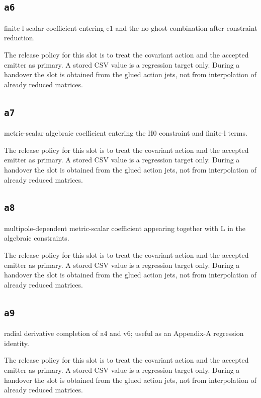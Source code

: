 \documentclass[11pt,a4paper,oneside]{book}
\begin{document}
\subsection{\texttt{a6}}
finite-l scalar coefficient entering e1 and the no-ghost combination after constraint reduction.

The release policy for this slot is to treat the covariant action and the accepted emitter as primary. A stored CSV value is a regression target only. During a handover the slot is obtained from the glued action jets, not from interpolation of already reduced matrices.\par

\subsection{\texttt{a7}}
metric-scalar algebraic coefficient entering the H0 constraint and finite-l terms.

The release policy for this slot is to treat the covariant action and the accepted emitter as primary. A stored CSV value is a regression target only. During a handover the slot is obtained from the glued action jets, not from interpolation of already reduced matrices.\par

\subsection{\texttt{a8}}
multipole-dependent metric-scalar coefficient appearing together with L in the algebraic constraints.

The release policy for this slot is to treat the covariant action and the accepted emitter as primary. A stored CSV value is a regression target only. During a handover the slot is obtained from the glued action jets, not from interpolation of already reduced matrices.\par

\subsection{\texttt{a9}}
radial derivative completion of a4 and v6; useful as an Appendix-A regression identity.

The release policy for this slot is to treat the covariant action and the accepted emitter as primary. A stored CSV value is a regression target only. During a handover the slot is obtained from the glued action jets, not from interpolation of already reduced matrices.\par
\end{document}
